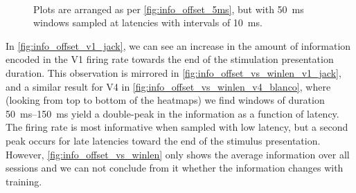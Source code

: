 \begin{figure}[htbp]%
    \centering
    \hspace*{\fill}
    \hspace*{\fill}\hspace{.2cm}\hspace*{\fill}
    \hspace*{\fill}
    \\
    \hspace*{\fill}
    \hspace*{\fill}\hspace{.2cm}\hspace*{\fill}
    \hspace*{\fill}
    \caption{
Plots are arranged as per \autoref{fig:info_offset_5ms}, but with \SI{50}{\milli\second} windows sampled at latencies with intervals of \SI{10}{\milli\second}.
    \label{fig:info_offset}
}
\end{figure}

In \autoref{fig:info_offset_v1_jack}, we can see an increase in the amount of information encoded in the \ac{V1} firing rate towards the end of the stimulation presentation duration.
This observation is mirrored in \autoref{fig:info_offset_vs_winlen_v1_jack}, and a similar result for \ac{V4} in \autoref{fig:info_offset_vs_winlen_v4_blanco}, where (looking from top to bottom of the heatmaps) we find windows of duration \SIrange{50}{150}{\milli\second} yield a double-peak in the information as a function of latency.
The firing rate is most informative when sampled with low latency, but a second peak occurs for late latencies toward the end of the stimulus presentation.
However, \autoref{fig:info_offset_vs_winlen} only shows the average information over all sessions and we can not conclude from it whether the information changes with training.


